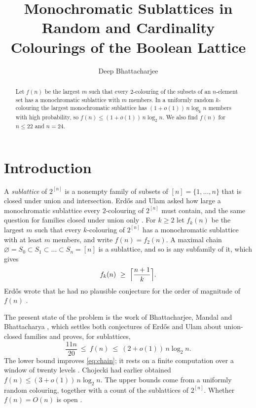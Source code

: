 \documentclass[11pt,reqno]{amsart}
\title[Monochromatic sublattices]{Monochromatic Sublattices in Random and
Cardinality Colourings of the Boolean Lattice}
\author{Deep Bhattacharjee}
\date{}
\numberwithin{equation}{section}
\theoremstyle{plain}
\theoremstyle{definition}
\theoremstyle{remark}
\begin{document}
\sloppy

\begin{abstract}
Let $f(n)$ be the largest $m$ such that every $2$-colouring of the subsets
of an $n$-element set has a monochromatic sublattice with $m$ members. In a
uniformly random $k$-colouring the largest monochromatic sublattice has
$(1+o(1))\,n\log_kn$ members with high probability, so $f(n)\le
(1+o(1))\,n\log_2n$. We also find $f(n)$ for $n\le22$ and $n=24$.
\end{abstract}

\maketitle

\section{Introduction}
\label{sec:intro}

A \emph{sublattice} of $2^{[n]}$ is a nonempty family of subsets of
$[n]=\{1,\dots,n\}$ that is closed under union and intersection. Erd\H{o}s
and Ulam asked how large a monochromatic sublattice every $2$-colouring of
$2^{[n]}$ must contain, and the same question for families closed under
union only \cite[Problem~\#1183]{Bl26}. For $k\ge2$ let $f_k(n)$ be the
largest $m$ such that every $k$-colouring of $2^{[n]}$ has a monochromatic
sublattice with at least $m$ members, and write $f(n)=f_2(n)$. A maximal
chain $\varnothing=S_0\subset S_1\subset\dots\subset S_n=[n]$ is a
sublattice, and so is any subfamily of it, which gives
\begin{equation}
\label{eq:chain}
f_k(n)\ \ge\ \Bigl\lceil\frac{n+1}{k}\Bigr\rceil .
\end{equation}
Erd\H{o}s wrote that he had no plausible conjecture for the order of
magnitude of $f(n)$ \cite{Bl26}.

The present state of the problem is the work of Bhattacharjee, Mandal and
Bhattacharya \cite{BMB26,BMB26v5}, which settles both conjectures of
Erd\H{o}s and Ulam about union-closed families and proves, for sublattices,
\begin{equation}
\label{eq:known}
\frac{11n}{20}\ \le\ f(n)\ \le\ (2+o(1))\,n\log_2n .
\end{equation}
The lower bound improves \eqref{eq:chain}; it rests on a finite
computation over a window of twenty levels \cite[Theorem~7.6]{BMB26v5}.
Chojecki \cite{Ch26} had earlier obtained $f(n)\le(3+o(1))\,n\log_2n$. The
upper bounds come from a uniformly random colouring, together with a count
of the sublattices of $2^{[n]}$. Whether $f(n)=O(n)$ is open
\cite[Question~9.3]{BMB26v5}.
\end{document}

